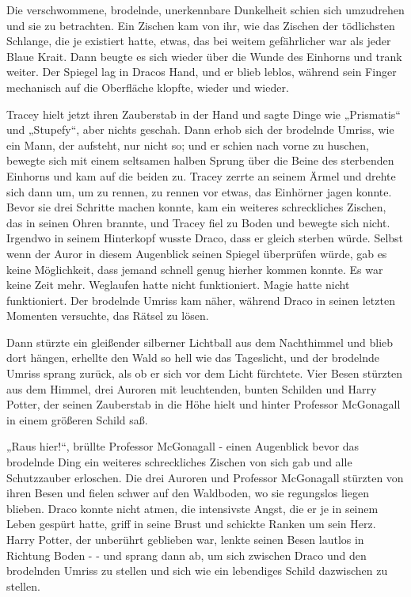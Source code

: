 {Die verschwommene, brodelnde, unerkennbare Dunkelheit schien sich umzudrehen und sie zu betrachten. Ein Zischen kam von ihr, wie das Zischen der tödlichsten Schlange, die je existiert hatte, etwas, das bei weitem gefährlicher war als jeder Blaue Krait. Dann beugte es sich wieder über die Wunde des Einhorns und trank weiter. Der Spiegel lag in Dracos Hand, und er blieb leblos, während sein Finger mechanisch auf die Oberfläche klopfte, wieder und wieder.

Tracey hielt jetzt ihren Zauberstab in der Hand und sagte Dinge wie „Prismatis“ und „Stupefy“, aber nichts geschah. Dann erhob sich der brodelnde Umriss, wie ein Mann, der aufsteht, nur nicht so; und er schien nach vorne zu huschen, bewegte sich mit einem seltsamen halben Sprung über die Beine des sterbenden Einhorns und kam auf die beiden zu. Tracey zerrte an seinem Ärmel und drehte sich dann um, um zu rennen, zu rennen vor etwas, das Einhörner jagen konnte. Bevor sie drei Schritte machen konnte, kam ein weiteres schreckliches Zischen, das in seinen Ohren brannte, und Tracey fiel zu Boden und bewegte sich nicht. Irgendwo in seinem Hinterkopf wusste Draco, dass er gleich sterben würde. Selbst wenn der Auror in diesem Augenblick seinen Spiegel überprüfen würde, gab es keine Möglichkeit, dass jemand schnell genug hierher kommen konnte. Es war keine Zeit mehr. Weglaufen hatte nicht funktioniert. Magie hatte nicht funktioniert. Der brodelnde Umriss kam näher, während Draco in seinen letzten Momenten versuchte, das Rätsel zu lösen.

Dann stürzte ein gleißender silberner Lichtball aus dem Nachthimmel und blieb dort hängen, erhellte den Wald so hell wie das Tageslicht, und der brodelnde Umriss sprang zurück, als ob er sich vor dem Licht fürchtete. Vier Besen stürzten aus dem Himmel, drei Auroren mit leuchtenden, bunten Schilden und Harry Potter, der seinen Zauberstab in die Höhe hielt und hinter Professor McGonagall in einem größeren Schild saß.

„Raus hier!“, brüllte Professor McGonagall - einen Augenblick bevor das brodelnde Ding ein weiteres schreckliches Zischen von sich gab und alle Schutzzauber erloschen. Die drei Auroren und Professor McGonagall stürzten von ihren Besen und fielen schwer auf den Waldboden, wo sie regungslos liegen blieben. Draco konnte nicht atmen, die intensivste Angst, die er je in seinem Leben gespürt hatte, griff in seine Brust und schickte Ranken um sein Herz. Harry Potter, der unberührt geblieben war, lenkte seinen Besen lautlos in Richtung Boden - - und sprang dann ab, um sich zwischen Draco und den brodelnden Umriss zu stellen und sich wie ein lebendiges Schild dazwischen zu stellen.

}
